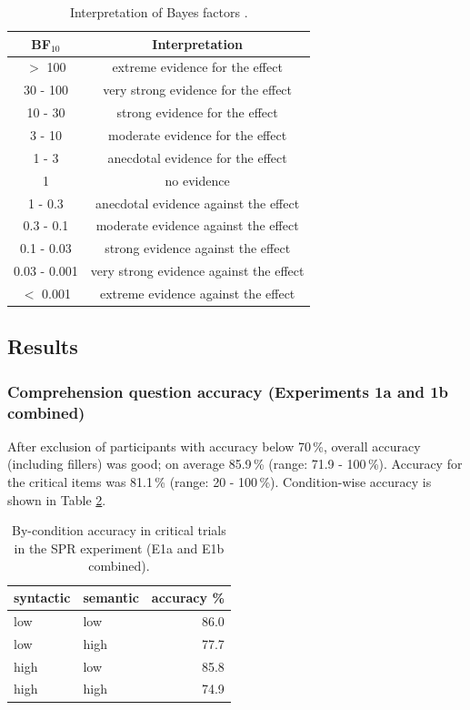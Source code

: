 \documentclass[review,preprint,12pt,authoryear,floatsintext]{elsarticle}
\begin{document}
\begin{table}[ht]
    \centering
    \caption{Interpretation of Bayes factors \citep{lee2014bayesian}.}
    \label{tab:bf_interpretation}
    \begin{tabular}{cc}
    \toprule
    BF$_{10}$ & Interpretation \\
    \midrule
$>$ 100 & extreme evidence for the effect\\
30 - 100 & very strong evidence for the effect\\
10 - 30 & strong evidence for the effect\\
3 - 10 & moderate evidence for the effect\\
1 - 3 &	anecdotal evidence for the effect\\
1  &	no evidence\\
1 - 0.3 & anecdotal evidence against the effect\\
0.3 - 0.1 & moderate evidence against the effect\\
0.1 - 0.03 & strong evidence against the effect\\
0.03 - 0.001 & very strong evidence against the effect\\
$<$ 0.001 & extreme evidence against the effect\\
\bottomrule
    \end{tabular}
\end{table}


\subsection{Results}
\subsubsection{Comprehension question accuracy (Experiments 1a and 1b combined)}

After exclusion of participants with accuracy below 70\,\%, overall accuracy (including fillers) was good; on average 85.9\,\% (range: 71.9 - 100\,\%). Accuracy for the critical items was 81.1\,\% (range: 20 - 100\,\%). Condition-wise accuracy is shown in Table \ref{tab:spr_acc}.

\begin{table}[ht]
    \caption{By-condition accuracy in critical trials in the SPR experiment (E1a and E1b combined).}
    \label{tab:spr_acc}
    \centering
    \begin{tabular}{llr}
    \toprule
    syntactic & semantic & accuracy \%\\
    \midrule
        low &  low & 86.0\\
        low &  high & 77.7\\
        high &  low & 85.8\\
        high &  high & 74.9\\
    \bottomrule
    \end{tabular}
\end{table}
\end{document}
